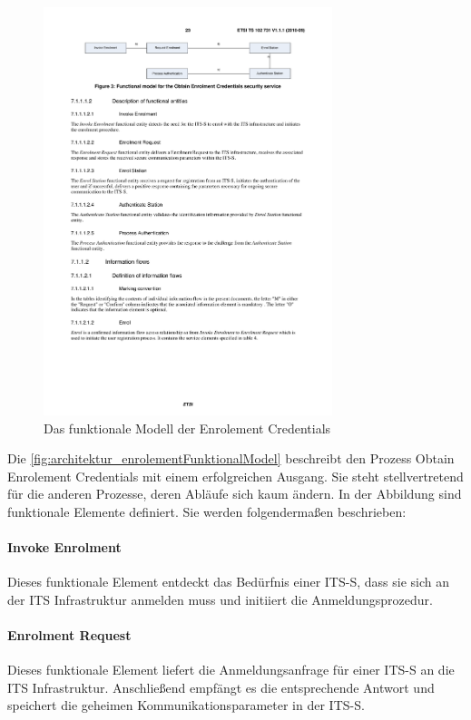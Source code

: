 \begin{figure}[h]
	\includegraphics[width=0.75\textwidth]{content/images/02_architektur/enrolementFunktionaleKomponenten.pdf}
	\caption{Das funktionale Modell der Enrolement Credentials \cite{ts102731}}
	\label{fig:architektur_enrolementFunktionalModel}
\end{figure}

Die \autoref{fig:architektur_enrolementFunktionalModel} beschreibt den Prozess Obtain Enrolement Credentials mit einem erfolgreichen Ausgang. Sie steht stellvertretend für die anderen Prozesse, deren Abläufe sich kaum ändern. In der Abbildung sind funktionale Elemente definiert. Sie werden folgendermaßen beschrieben:
\paragraph{Invoke Enrolment} Dieses funktionale Element entdeckt das Bedürfnis einer \ac{ITS-S}, dass sie sich an der \ac{ITS} Infrastruktur anmelden muss und initiiert die Anmeldungsprozedur.

\paragraph{Enrolment Request} Dieses funktionale Element liefert die Anmeldungsanfrage für einer \ac{ITS-S} an die \ac{ITS} Infrastruktur. Anschließend empfängt es die entsprechende Antwort und speichert die geheimen Kommunikationsparameter in der \ac{ITS-S}.


